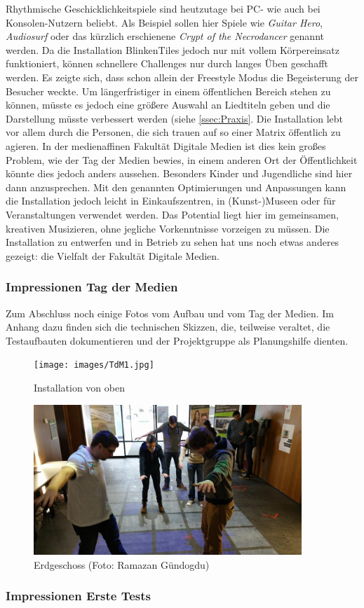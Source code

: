 
Rhythmische Geschicklichkeitspiele sind heutzutage bei PC- wie auch bei Konsolen-Nutzern beliebt. Als Beispiel sollen hier Spiele wie \textit{Guitar Hero}, \textit{Audiosurf} oder das kürzlich erschienene \textit{Crypt of the Necrodancer} genannt werden. Da die Installation BlinkenTiles jedoch nur mit vollem Körpereinsatz funktioniert, können schnellere Challenges nur durch langes Üben geschafft werden. Es zeigte sich, dass schon allein der Freestyle Modus die Begeisterung der Besucher weckte. Um längerfristiger in einem öffentlichen Bereich stehen zu können, müsste es jedoch eine größere Auswahl an Liedtiteln geben und die Darstellung müsste verbessert werden (siehe \autoref{ssec:Praxis}. Die Installation lebt vor allem durch die Personen, die sich trauen auf so einer Matrix öffentlich zu agieren. In der medienaffinen Fakultät Digitale Medien ist dies kein großes Problem, wie der Tag der Medien bewies, in einem anderen Ort der Öffentlichkeit könnte dies jedoch anders aussehen. Besonders Kinder und Jugendliche sind hier dann anzusprechen. Mit den genannten Optimierungen und Anpassungen kann die Installation jedoch leicht in Einkaufszentren, in (Kunst-)Museen oder für Veranstaltungen verwendet werden. Das Potential liegt hier im gemeinsamen, kreativen Musizieren, ohne jegliche Vorkenntnisse vorzeigen zu müssen. Die Installation zu entwerfen und in Betrieb zu sehen hat uns noch etwas anderes gezeigt: die Vielfalt der Fakultät Digitale Medien.

\subsubsection{Impressionen Tag der Medien}
Zum Abschluss noch einige Fotos vom Aufbau und vom Tag der Medien. Im Anhang dazu finden sich die technischen Skizzen, die, teilweise veraltet, die Testaufbauten dokumentieren und der Projektgruppe als Planungshilfe dienten.

\begin{figure}[htbp]
	\centering
		\texttt{[image: images/TdM1.jpg]}
	\caption{Installation von oben}
	\label{fig:TdM1}
\end{figure}

\begin{figure}[htbp]
	\centering
		\includegraphics[width=0.9\textwidth]{images/TdM2.jpg}
	\caption{Erdgeschoss (Foto: Ramazan Gündogdu)}
	\label{fig:TdM2}
\end{figure}

\subsubsection{Impressionen Erste Tests}